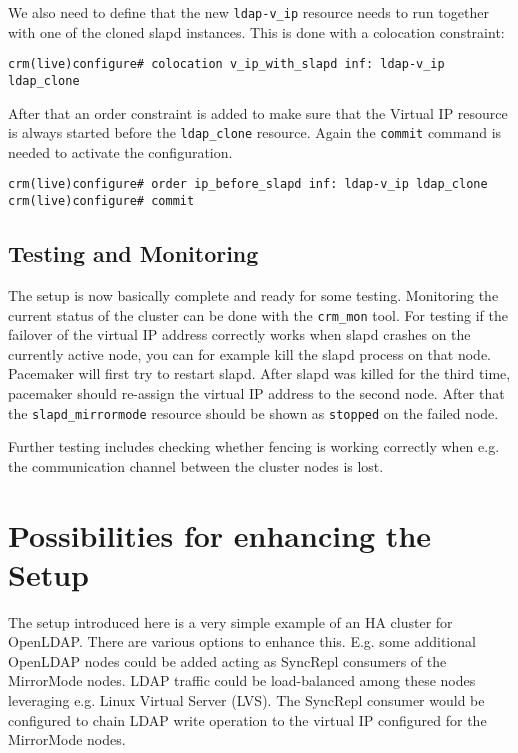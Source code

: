 \documentclass[a4paper,11pt,DIV=12]{scrartcl}
\begin{document}
    We also need to define that the new \verb|ldap-v_ip| resource needs to
    run together with one of the cloned slapd instances. This is done with
    a colocation constraint:
    \begin{verbatim}
crm(live)configure# colocation v_ip_with_slapd inf: ldap-v_ip ldap_clone
    \end{verbatim}

    After that an order constraint is added to make sure that the Virtual IP
    resource is always started before the \verb|ldap_clone| resource. Again
    the \verb|commit| command is needed to activate the configuration.
    \begin{verbatim}
crm(live)configure# order ip_before_slapd inf: ldap-v_ip ldap_clone
crm(live)configure# commit
    \end{verbatim}

\subsection{Testing and Monitoring}
    The setup is now basically complete and ready for some testing. Monitoring
    the current status of the cluster can be done with the \verb|crm_mon| tool.
    For testing if the failover of the virtual IP address correctly works when
    slapd crashes on the currently active node, you can for example kill the
    slapd process on that node. Pacemaker will first try to
    restart slapd. After slapd was killed for the third time, pacemaker should
    re-assign the virtual IP address to the second node. After that the
    \verb|slapd_mirrormode| resource should be shown as \verb|stopped| on the
    failed node.

    Further testing includes checking whether fencing is working correctly when
    e.g. the communication channel between the cluster nodes is lost.

\section{Possibilities for enhancing the Setup}
    The setup introduced here is a very simple example of an HA cluster for
    OpenLDAP. There are various options to enhance this. E.g. some additional
    OpenLDAP nodes could be added acting as SyncRepl consumers of the MirrorMode
    nodes. LDAP traffic could be load-balanced among these nodes leveraging e.g.
    Linux Virtual Server (LVS). The SyncRepl consumer would be configured to
    chain LDAP write operation to the virtual IP configured for the MirrorMode
    nodes.
\end{document}
